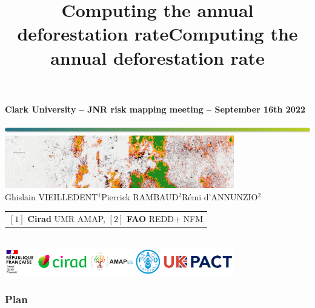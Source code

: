 \documentclass[10pt,table,dvipsnames,compress]{beamer}
\date{}
\title{Computing the annual deforestation rate}
\title[Annual deforestation rate]{Computing the annual deforestation rate}
\newif\ifplacelogo %
\begin{document}
{
  \begin{frame}
  
  \begin{center}
  \small{\textbf{Clark University -- JNR risk mapping meeting -- September 16th 2022}}
  \end{center}
  \vspace{-1cm}
  \titlepage %
  \vspace{-3.5cm}
  \begin{center}
    \includegraphics[width=\textwidth]{figs/Barre_couleur}\\
    \vspace{0.5cm}
    \includegraphics[width=10cm]{figs/riskmapjnr-example}\\
    \vspace{0.3cm}
    \small{Ghislain VIEILLEDENT$^{1}$\hspace{0.25cm}Pierrick RAMBAUD$^{2}$\hspace{0.25cm}Rémi d'ANNUNZIO$^{2}$}\\
    \vspace{0.15cm}
    {\scriptsize
      \begin{tabular}{l}
        $[1]$ \textbf{Cirad} UMR AMAP, $[2]$ \textbf{FAO} REDD$+$ NFM
      \end{tabular}
    }\\
    \vspace{0.3cm}
    \includegraphics[width=0.75\textwidth]{figs/partners_logos}
    
  \end{center}
  \end{frame}
}


\placelogotrue
\begin{frame}
  \frametitle{Plan}
  \begin{columns}[c]
    \begin{column}{0.5\textwidth}
      \tableofcontents[sections=1]
      \vspace{0.5cm}
      \tableofcontents[sections=2]
    \end{column}
    \begin{column}{0.5\textwidth}
        \tableofcontents[sections=3]
        \vspace{0.5cm}
        \tableofcontents[sections=4]
    \end{column}
  \end{columns}
\end{frame}
\placelogofalse
\end{document}
